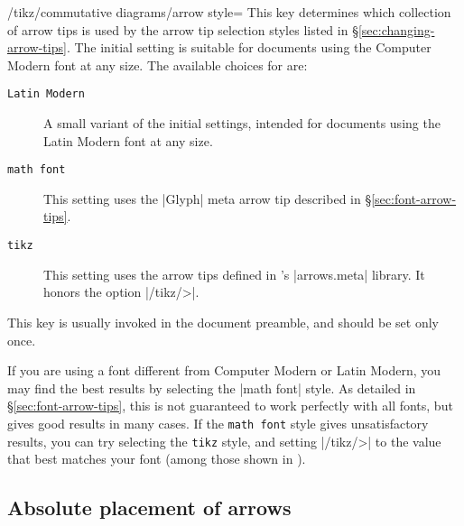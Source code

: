\documentclass[a4paper]{ltxdoc}
\begin{document}
\begin{key}{/tikz/commutative diagrams/arrow style=}
  This key determines which collection of arrow tips is used by the
  arrow tip selection styles listed in
  \S\ref{sec:changing-arrow-tips}.  The initial setting is suitable
  for documents using the Computer Modern font at any size.  The
  available choices for  are:
  \begin{description}
  \item[\texttt{Latin Modern}] A small variant of the initial
    settings, intended for documents using the Latin Modern font at
    any size.
  \item[\texttt{math font}] This setting uses the |Glyph| meta arrow
    tip described in \S\ref{sec:font-arrow-tips}.
  \item[\texttt{tikz}] This setting uses the arrow tips defined in
    \tikzname's |arrows.meta| library.  It honors the option
    |/tikz/>|.
  \end{description}

  This key is usually invoked in the document preamble, and should be
  set only once.
\end{key}

If you are using a font different from Computer Modern or Latin
Modern, you may find the best results by selecting the |math font|
style.  As detailed in \S\ref{sec:font-arrow-tips}, this is not
guaranteed to work perfectly with all fonts, but gives good results in
many cases.  If the \texttt{math font} style gives unsatisfactory
results, you can try selecting the \texttt{tikz} style, and setting
|/tikz/>| to the value that best matches your font (among those shown
in \cite[\S\ref*{pgfman-section-arrows-meta}]{pgfman}).

\begin{codeexample}[]

\end{codeexample}

\subsection{Absolute placement of arrows}
\label{sec:absol-positioning}
\end{document}
